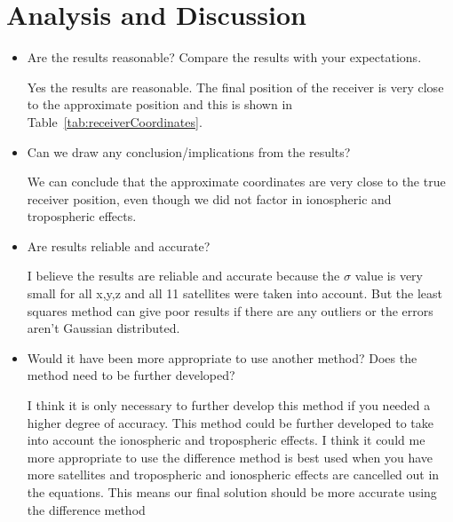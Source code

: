 \section{Analysis and Discussion} %
\label{sec:analysis_and_discussion}
\begin{itemize}
	\item Are the results reasonable? Compare the results with your expectations.
	
	Yes the results are reasonable.  The final position of the receiver is very close to the approximate position and this is shown in Table~\ref{tab:receiverCoordinates}.
	\item Can we draw any conclusion/implications from the results?  
	
	We can conclude that the approximate coordinates are very close to the true receiver position, even though we did not factor in ionospheric and tropospheric effects.
	\item Are results reliable and accurate?
	
	I believe the results are reliable and accurate because the $\sigma$ value is very small for all x,y,z and all 11 satellites were taken into account.  But the least squares method can give poor results if there are any outliers or the errors aren't Gaussian distributed.\cite{Garcia:1999:NMP:554354}  
	\item Would it have been more appropriate to use another method? Does the method need to be further developed?
	
	I think it is only necessary to further develop this method if you needed a higher degree of accuracy.  This method could be further developed to take into account the ionospheric and tropospheric effects.  I think it could me more appropriate to use the difference method is best used when you have more satellites and tropospheric and ionospheric effects are cancelled out in the equations.  This means our final solution should be more accurate using the difference method
\end{itemize}

